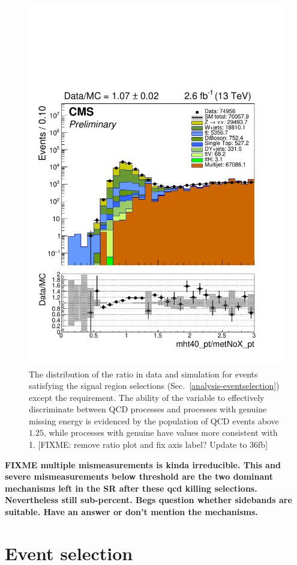 \begin{figure}
\begin{center}
\includegraphics[width=0.7\linewidth]{figs/analysis/mhtmet}
\caption{The distribution of the \mhtmet ratio in data and simulation for 
events satisfying the signal region selections 
(Sec.~\ref{analysis-eventselection}) except the \mhtmet requirement. The 
ability of the variable to effectively discriminate between QCD processes and 
processes with genuine missing energy is evidenced by the population of QCD 
events above $1.25$, while processes with genuine \met have values more 
consistent with 1. [FIXME: remove ratio plot and fix axis label? Update to 
36fb]}
\label{fig:mhtmet}
\end{center}
\end{figure}




\textbf{FIXME
multiple mismeasurements is kinda irreducible.
This and severe mismeasurements below threshold are the two dominant mechanisms 
left in the SR after these qcd killing selections.
Nevertheless still sub-percent.
Begs question whether sidebands are suitable. Have an answer or don't mention 
the mechanisms.}




\section{Event selection}
\label{sec:analysis-eventselection}

